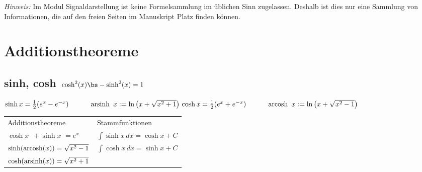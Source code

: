 \documentclass[6pt,a4paper]{scrartcl}
\begin{document}
\vspace{-4mm}
\begin{multicols}{4}

	\emph{Hinweis:} Im Modul Signaldarstellung ist keine Formelsammlung im üblichen Sinn zugelassen. Deshalb ist dies nur eine Sammlung von Informationen, die auf den freien Seiten im Manuskript Platz finden können.

	\section{Additionstheoreme}
		\subsection{sinh, cosh \quad $\cosh^2(x)  \bs - \sinh^2(x) = 1$}
			$\sinh x = \frac{1}{2}(e^x -e^{-x}) \qquad \quad \operatorname{arsinh}\ x:= \ln\left(x+\sqrt{x^2+1}\right) \\
			\cosh x  = \frac{1}{2}(e^x +e^{-x}) \qquad \quad \operatorname{arcosh}\ x:= \ln\left(x+\sqrt{x^2-1}\right)$

			\begin{tabular}{ll}
				Additionstheoreme &	Stammfunktionen \\
				$\cosh x \,\; + \sinh x \,\,= e^{x}$ & $\int \sinh x \, dx = \cosh x + C$\\
				$\sinh({\rm arcosh}(x)) = \sqrt{x^2 - 1}$ & $\int \cosh x \, dx = \sinh x + C $\\
				$\cosh({\rm arsinh}(x)) = \sqrt{x^2 + 1}$ 	
			\end{tabular}

\end{multicols}
\end{document}
